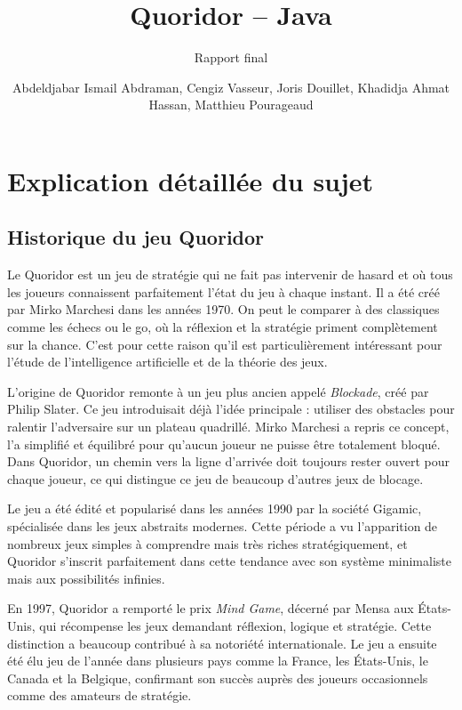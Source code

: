 \documentclass[a4paper]{article}
\title{Quoridor -- Java}
\subtitle{Rapport final}
\author{Abdeldjabar Ismail Abdraman, Cengiz Vasseur, Joris Douillet, Khadidja Ahmat Hassan, Matthieu Pourageaud}
\begin{document}

\maketitle
\thispagestyle{empty}


\section{Explication détaillée du sujet}
\subsection{Historique du jeu Quoridor}
Le Quoridor est un jeu de stratégie qui ne fait pas intervenir de hasard et où tous les joueurs connaissent parfaitement l’état du jeu à chaque instant. Il a été créé par Mirko Marchesi dans les années 1970. On peut le comparer à des classiques comme les échecs ou le go, où la réflexion et la stratégie priment complètement sur la chance. C’est pour cette raison qu’il est particulièrement intéressant pour l’étude de l’intelligence artificielle et de la théorie des jeux.

L’origine de Quoridor remonte à un jeu plus ancien appelé \textit{Blockade}, créé par Philip Slater. Ce jeu introduisait déjà l’idée principale : utiliser des obstacles pour ralentir l’adversaire sur un plateau quadrillé. Mirko Marchesi a repris ce concept, l’a simplifié et équilibré pour qu’aucun joueur ne puisse être totalement bloqué. Dans Quoridor, un chemin vers la ligne d’arrivée doit toujours rester ouvert pour chaque joueur, ce qui distingue ce jeu de beaucoup d’autres jeux de blocage.

Le jeu a été édité et popularisé dans les années 1990 par la société Gigamic, spécialisée dans les jeux abstraits modernes. Cette période a vu l’apparition de nombreux jeux simples à comprendre mais très riches stratégiquement, et Quoridor s’inscrit parfaitement dans cette tendance avec son système minimaliste mais aux possibilités infinies.

En 1997, Quoridor a remporté le prix \textit{Mind Game}, décerné par Mensa aux États-Unis, qui récompense les jeux demandant réflexion, logique et stratégie. Cette distinction a beaucoup contribué à sa notoriété internationale. Le jeu a ensuite été élu jeu de l’année dans plusieurs pays comme la France, les États-Unis, le Canada et la Belgique, confirmant son succès auprès des joueurs occasionnels comme des amateurs de stratégie.
\end{document}
